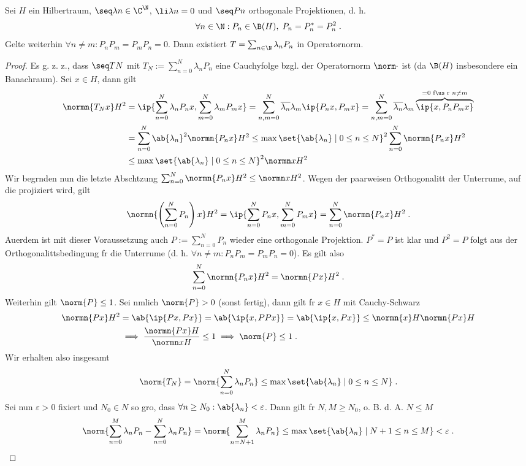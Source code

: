 \begin{theorem}
	Sei $H$ ein Hilbertraum, \(\seq \lambda n \in \C^\N\), \(\li \lambda n = 0\) und \(\seq Pn\) orthogonale Projektionen, d. h. 
	\[\forall n\in\N: P_n \in \B(H), \;P_n = P^*_n = P_n^2\;.\]
	Gelte weiterhin \(\forall n\neq m: P_n P_m = P_m P_n = 0\).
	Dann existiert \(T = \sum_{n\in\N} \lambda_n P_n\) in Operatornorm.
	\label{spec_comp_pre_2}
\end{theorem}
\begin{proof}
	Es g. z. z., dass \(\seq TN\) mit \(T_N := \sum_{n=0}^N \lambda_n P_n\) eine Cauchyfolge bzgl. der Operatornorm \(\norm\cdot\) ist (da \(\B(H)\) insbesondere ein Banachraum). Sei \(x\in H\), dann gilt
	\begin{align*}
		\normn{T_Nx}H^2 &= \ip{\sum_{n=0}^N \lambda_n P_n x, \sum_{m=0}^N \lambda_m P_m x} = \sum_{n,m=0}^N \overline{\lambda_n}\lambda_m \ip{P_n x, P_m x} =  \sum_{n,m=0}^N \overline{\lambda_n}\lambda_m \overbrace{\ip{x, P_nP_mx}}^{=0\text{ f\us r } n\neq m} \\
		& = \sum_{n=0}^N \ab{\lambda_n}^2 \normn{P_nx}H^2 \leq \max\set{\ab{\lambda_n}\;\vert\; 0 \leq n \leq N}^2 \sum_{n=0}^N \normn{P_nx}H^2 \\
		& \leq  \max\set{\ab{\lambda_n} \;\vert\; 0 \leq n \leq N}^2  \normn xH^2
	\end{align*}
	Wir begr\us nden nun die letzte Absch\as tzung \(\sum_{n=0}^N \normn{P_nx}H^2 \leq \normn xH^2\). Wegen der paarweisen Orthogonalit\as t der Unterr\as ume, auf die projiziert wird, gilt
	\[\normn{\left(\sum_{n=0}^N P_n\right)x}H^2 =  \ip{\sum_{n=0}^N P_n x, \sum_{m=0}^N P_m x} = \sum_{n=0}^N \normn{P_nx}H^2\;.\]
	Au\s erdem ist mit dieser Voraussetzung auch \(P:= \sum_{n=0}^N P_n\) wieder eine orthogonale Projektion. \(P^* = P\) ist klar und \(P^2 = P\) folgt aus der Orthogonalit\as tsbedingung f\us r die Unterr\as ume (d. h. \(\forall n\neq m: P_n P_m = P_m P_n = 0\)). Es gilt also 
	\[\sum_{n=0}^N\normn{P_nx}H^2 = \normn{Px}H^2\;.\]
	Weiterhin gilt  \(\norm{P} \leq 1\). Sei n\as mlich \(\norm{P} > 0 \) (sonst fertig), dann gilt f\us r \(x\in H\) mit Cauchy-Schwarz
	\begin{align*}
	\normn{Px}H^2 &= \ab{\ip{Px, Px}} = \ab{\ip{x, PPx}} = \ab{\ip{x, Px}} \leq \normn{x}H \normn{Px}H \\&\implies \frac{\normn{Px}H}{\normn xH} \leq 1 \implies \norm{P} \leq 1\;.
	\end{align*}
	Wir erhalten also insgesamt
	\[\norm{T_N} = \norm{\sum_{n=0}^N \lambda_n P_n} \leq \max\set{\ab{\lambda_n}\;\vert\; 0 \leq n\leq N}\;.\]
	Sei nun \(\varepsilon > 0\) fixiert und \(N_0 \in N\) so gro\s{}, dass \(\forall n \geq N_0: \ab{\lambda_n}<\varepsilon\). Dann gilt f\us r \(N, M \geq N_0\), o. B. d. A. \(N \leq M\) 
	\[\norm{\sum_{n=0}^M \lambda_n P_n - \sum_{n=0}^N \lambda_n P_n} = \norm{\sum_{n=N+1}^M \lambda_n P_n} \leq  \max\set{\ab{\lambda_n}\;\vert\; N+1 \leq n \leq M} < \varepsilon\;.\]
	
\end{proof}

